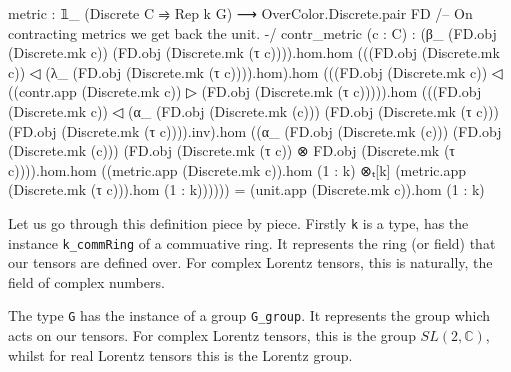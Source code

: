 \documentclass[a4paper, 11pt]{article}
\begin{document}
\begin{codeLong}
  metric : 𝟙_ (Discrete C ⥤ Rep k G) ⟶ OverColor.Discrete.pair FD
  /-- On contracting metrics we get back the unit. -/
  contr_metric (c : C) :
    (β_ (FD.obj (Discrete.mk c)) (FD.obj (Discrete.mk (τ c)))).hom.hom
    (((FD.obj (Discrete.mk c)) ◁ (λ_ (FD.obj (Discrete.mk (τ c)))).hom).hom
    (((FD.obj (Discrete.mk c)) ◁ ((contr.app (Discrete.mk c)) ▷
    (FD.obj (Discrete.mk (τ c))))).hom
    (((FD.obj (Discrete.mk c)) ◁ (α_ (FD.obj (Discrete.mk (c)))
      (FD.obj (Discrete.mk (τ c))) (FD.obj (Discrete.mk (τ c)))).inv).hom
    ((α_ (FD.obj (Discrete.mk (c))) (FD.obj (Discrete.mk (c)))
      (FD.obj (Discrete.mk (τ c)) ⊗ FD.obj (Discrete.mk (τ c)))).hom.hom
    ((metric.app (Discrete.mk c)).hom (1 : k) ⊗ₜ[k]
      (metric.app (Discrete.mk (τ c))).hom (1 : k))))))
    = (unit.app (Discrete.mk c)).hom (1 : k)
\end{codeLong}

Let us go through this definition piece by piece.
Firstly \lstinline|k| is a type, has the instance \lstinline|k_commRing| of a commuative ring. 
It represents the ring (or field) that our tensors are defined over. For complex Lorentz tensors, 
this is naturally, the field of complex numbers. 

The type \lstinline|G| has the instance of a group \lstinline|G_group|. It represents 
the group which acts on our tensors. For complex Lorentz tensors, this is the group 
$SL(2, \mathbb{C})$, whilst for real Lorentz tensors this is the Lorentz group. 
\end{document}
